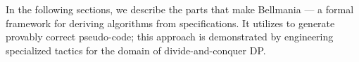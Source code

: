 In the following sections, we describe the parts that make Bellmania --- a formal framework for deriving algorithms from specifications. 
It utilizes  to generate provably correct pseudo-code; 
this approach is demonstrated by engineering specialized tactics for the domain of divide-and-conquer DP.


\begin{figure}
\centering
{}
\end{figure}
